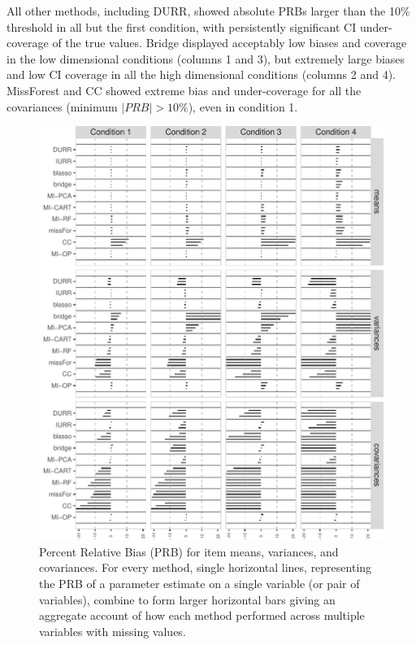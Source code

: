 	All other methods, including DURR, showed absolute PRBs larger than the 10\% threshold in all but the 
	first condition, with persistently significant CI under-coverage of the true values.
	Bridge displayed acceptably low biases and coverage in the low dimensional conditions (columns 1 and 3), but 
	extremely large biases and low CI coverage in all the high dimensional conditions (columns 2 and 4).
	MissForest and CC showed extreme bias and under-coverage for all the covariances (minimum $|PRB|>10\%$),
	even in condition 1.
	
\begin{figure}
\centering
\includegraphics{../../output/graphs/exp1_bias_summy.pdf}
\caption{\label{fig:exp1bias}
	Percent Relative Bias (PRB) for item means, variances, and covariances.
	For every method, single horizontal lines, representing the PRB of a parameter estimate on 
	a single variable (or pair of variables), combine to form larger horizontal bars giving an 
	aggregate account of how each method performed across multiple variables with missing values.
	}
\end{figure}

